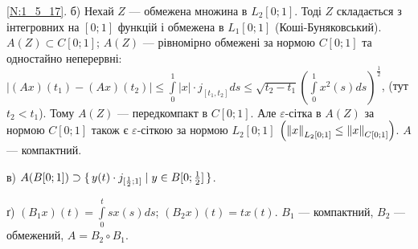 \noindent\ref{N:1_5_17}. б) Нехай $Z$ --- обмежена множина в $L_2[0;1]$. Тоді $Z$
складається з інтегровних на $[0;1]$ функцій і обмежена в $L_1[0;1]$ (Коші-Буняковський).
$A(Z) \subset C[0;1]$; $A(Z)$ --- рівномірно обмежені за нормою $C[0;1]$ та одностайно
неперервні: $\left|(Ax)(t_1) - (Ax)(t_2)\right| \leq \int\limits^1_0 |x| \cdot j_{[t_1,t_2]} ds \leq
\sqrt{t_2 - t_1} \left(\int\limits^1_0 x^2(s) ds\right)^{\frac{1}{2}}$, (тут $t_2 < t_1$).
Тому $A(Z)$ --- передкомпакт в $C[0;1]$. Але $\varepsilon$-сітка в $A(Z)$ за нормою $C[0;1]$ 
також є $\varepsilon$-сіткою за нормою $L_2[0;1]$ $\left(\left\lVert x\right\rVert_{L_2[0;1]} \leq 
\left\lVert x\right\rVert_{C[0;1]} \right)$. $A$ --- компактний.

\noindent в) $A(B[0;1]) \supset \set{y(t) \cdot j_{[\frac{1}{2};1]} \mid y \in B[0; \frac{1}{2}]}$.

\noindent ґ) $(B_1 x)(t) = \int\limits^t_0 s x(s) ds$; $(B_2 x)(t) = t x(t)$.
$B_1$ --- компактний, $B_2$ --- обмежений, $A = B_2 \circ B_1$.